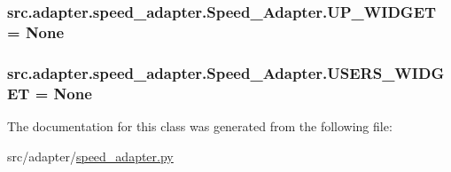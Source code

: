 \subsubsection[{U\+P\+\_\+\+W\+I\+D\+G\+E\+T}]{\setlength{\rightskip}{0pt plus 5cm}src.\+adapter.\+speed\+\_\+adapter.\+Speed\+\_\+\+Adapter.\+U\+P\+\_\+\+W\+I\+D\+G\+E\+T = None\hspace{0.3cm}{\ttfamily [static]}}\label{classsrc_1_1adapter_1_1speed__adapter_1_1Speed__Adapter_a8c3f1760b329c8da444488fd50f1a128}
\hypertarget{classsrc_1_1adapter_1_1speed__adapter_1_1Speed__Adapter_a02e9c7a2cd8b9d8c8a9dc8921ba32768}{}
\subsubsection[{U\+S\+E\+R\+S\+\_\+\+W\+I\+D\+G\+E\+T}]{\setlength{\rightskip}{0pt plus 5cm}src.\+adapter.\+speed\+\_\+adapter.\+Speed\+\_\+\+Adapter.\+U\+S\+E\+R\+S\+\_\+\+W\+I\+D\+G\+E\+T = None\hspace{0.3cm}{\ttfamily [static]}}\label{classsrc_1_1adapter_1_1speed__adapter_1_1Speed__Adapter_a02e9c7a2cd8b9d8c8a9dc8921ba32768}


The documentation for this class was generated from the following file\+:\begin{DoxyCompactItemize}
\item 
src/adapter/\hyperlink{speed__adapter_8py}{speed\+\_\+adapter.\+py}\end{DoxyCompactItemize}
